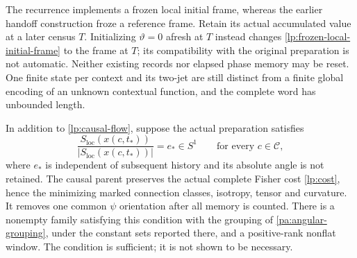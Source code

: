 The recurrence implements a frozen local initial frame, whereas the earlier handoff construction froze a reference frame. Retain its actual accumulated value at a later census $T$. Initializing $\vartheta=0$ afresh at $T$ instead changes \cref{lp:frozen-local-initial-frame} to the frame at $T$; its compatibility with the original preparation is not automatic. Neither existing records nor elapsed phase memory may be reset. One finite state per context and its two-jet are still distinct from a finite global encoding of an unknown contextual function, and the complete word has unbounded length.

In addition to \cref{lp:causal-flow}, suppose the actual preparation satisfies
\begin{equation}
 \frac{S_{\mathrm{loc}}(x(c,t_*))}{|S_{\mathrm{loc}}(x(c,t_*))|}
 =e_*\in S^1\qquad\text{for every }c\in\mathcal C,
 \label{lp:initial-coherence}
\end{equation}
where $e_*$ is independent of subsequent history and its absolute angle is not retained. The causal parent preserves the actual complete Fisher cost \cref{lp:cost}, hence the minimizing marked connection classes, isotropy, tensor and curvature. It removes one common $\psi$ orientation after all memory is counted. There is a nonempty family satisfying this condition with the grouping of \cref{pa:angular-grouping}, under the constant sets reported there, and a positive-rank nonflat window. The condition is sufficient; it is not shown to be necessary.
